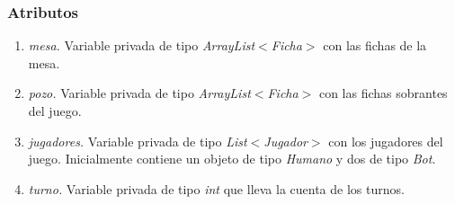 \documentclass[12pt]{article}
\begin{document}
  \subsubsection{Atributos}
  \begin{enumerate}
    \item \textit{mesa.} Variable privada de tipo \textit{ArrayList$<$Ficha$>$} con las fichas de la mesa.
    \item \textit{pozo.} Variable privada de tipo \textit{ArrayList$<$Ficha$>$} con las fichas sobrantes del juego.
    \item \textit{jugadores.} Variable privada de tipo \textit{List$<$Jugador$>$} con los jugadores del juego. Inicialmente contiene un objeto de tipo \textit{Humano} y dos de tipo \textit{Bot}.
    \item \textit{turno.} Variable privada de tipo \textit{int} que lleva la cuenta de los turnos.
  \end{enumerate}
\end{document}
